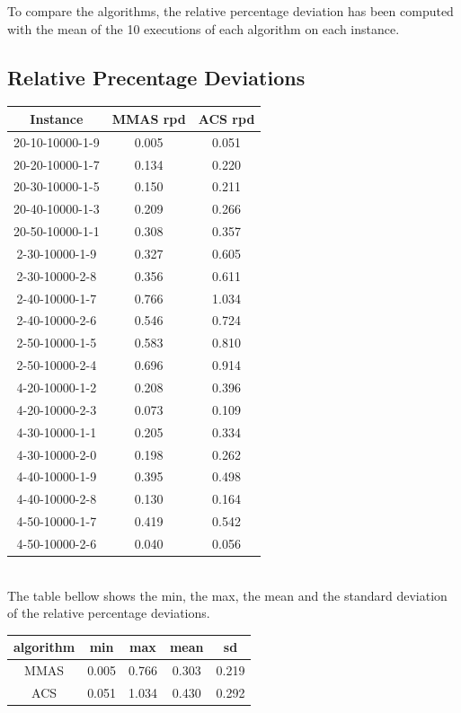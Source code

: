\documentclass{article}
\begin{document}
To compare the algorithms, the relative percentage deviation has been computed with the mean of the 10 executions of each algorithm on each instance.\\

\subsection{Relative Precentage Deviations}

\begin{tabular}{c|c|c}
    Instance & MMAS rpd & ACS rpd \\
    \hline
    20-10-10000-1-9 & 0.005 & 0.051 \\
    20-20-10000-1-7 & 0.134 & 0.220 \\
    20-30-10000-1-5 & 0.150 & 0.211 \\
    20-40-10000-1-3 & 0.209 & 0.266 \\
    20-50-10000-1-1 & 0.308 & 0.357 \\
    2-30-10000-1-9 & 0.327 & 0.605 \\
    2-30-10000-2-8 & 0.356 & 0.611 \\
    2-40-10000-1-7 & 0.766 & 1.034 \\
    2-40-10000-2-6 & 0.546 & 0.724 \\
    2-50-10000-1-5 & 0.583 & 0.810 \\
    2-50-10000-2-4 & 0.696 & 0.914 \\
    4-20-10000-1-2 & 0.208 & 0.396 \\
    4-20-10000-2-3 & 0.073 & 0.109 \\
    4-30-10000-1-1 & 0.205 & 0.334 \\
    4-30-10000-2-0 & 0.198 & 0.262 \\
    4-40-10000-1-9 & 0.395 & 0.498 \\
    4-40-10000-2-8 & 0.130 & 0.164 \\
    4-50-10000-1-7 & 0.419 & 0.542 \\
    4-50-10000-2-6 & 0.040 & 0.056
\end{tabular}\\

The table bellow shows the min, the max, the mean and the standard deviation of the relative percentage deviations.\\

\begin{tabular}{c|c|c|c|c}
    algorithm & min & max & mean & sd \\
    \hline
    MMAS & 0.005 & 0.766 & 0.303 & 0.219 \\
    ACS & 0.051 & 1.034 & 0.430  & 0.292
\end{tabular}\\
\end{document}
